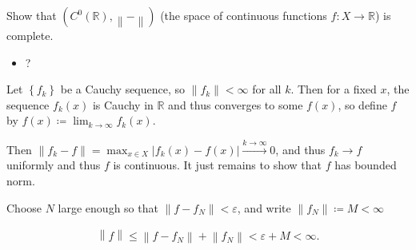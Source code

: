 Show that \((C^0({\mathbb{R}}), {\left\lVert {{-}} \right\rVert} )\)
(the space of continuous functions \(f: X\to {\mathbb{R}}\)) is
complete.


\begin{solution}

\hfill

\begin{concept}

\hfill

\begin{itemize}
\tightlist
\item
  ?
\end{itemize}

\end{concept}

Let \(\left\{{f_k}\right\}\) be a Cauchy sequence, so
\({\left\lVert {f_k} \right\rVert} < \infty\) for all \(k\). Then for a
fixed \(x\), the sequence \(f_k(x)\) is Cauchy in \({\mathbb{R}}\) and
thus converges to some \(f(x)\), so define \(f\) by
\(f(x) \coloneqq\lim_{k\to\infty} f_k(x)\).

Then
\({\left\lVert {f_k - f} \right\rVert} = \max_{x\in X}{\left\lvert {f_k(x) - f(x)} \right\rvert} \overset{k\to\infty}\to 0\),
and thus \(f_k \to f\) uniformly and thus \(f\) is continuous. It just
remains to show that \(f\) has bounded norm.

Choose \(N\) large enough so that
\({\left\lVert {f - f_N} \right\rVert} < \varepsilon\), and write
\({\left\lVert {f_N} \right\rVert} \coloneqq M < \infty\)

\begin{align*}
{\left\lVert {f} \right\rVert} \leq {\left\lVert {f - f_N} \right\rVert} + {\left\lVert {f_N} \right\rVert} < \varepsilon + M < \infty
.\end{align*}

\end{solution}


\printbibliography[title=Bibliography]



